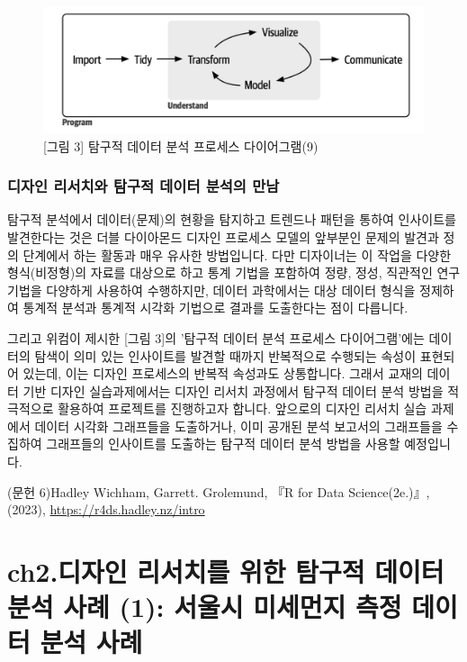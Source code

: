 \documentclass[
  letterpaper,
]{book}
\begin{document}
\begin{figure}[H]

{\centering \includegraphics{img/fig3.png}

}

\caption{{[}그림 3{]} 탐구적 데이터 분석 프로세스 다이어그램(9)}

\end{figure}%

\subsection{디자인 리서치와 탐구적 데이터 분석의
만남}\label{uxb514uxc790uxc778-uxb9acuxc11cuxce58uxc640-uxd0d0uxad6cuxc801-uxb370uxc774uxd130-uxbd84uxc11duxc758-uxb9ccuxb0a8}

탐구적 분석에서 데이터(문제)의 현황을 탐지하고 트렌드나 패턴을 통하여
인사이트를 발견한다는 것은 더블 다이아몬드 디자인 프로세스 모델의
앞부분인 문제의 발견과 정의 단계에서 하는 활동과 매우 유사한 방법입니다.
다만 디자이너는 이 작업을 다양한 형식(비정형)의 자료를 대상으로 하고
통계 기법을 포함하여 정량, 정성, 직관적인 연구 기법을 다양하게 사용하여
수행하지만, 데이터 과학에서는 대상 데이터 형식을 정제하여 통계적 분석과
통계적 시각화 기법으로 결과를 도출한다는 점이 다릅니다.

그리고 위컴이 제시한 {[}그림 3{]}의 '탐구적 데이터 분석 프로세스
다이어그램'에는 데이터의 탐색이 의미 있는 인사이트를 발견할 때까지
반복적으로 수행되는 속성이 표현되어 있는데, 이는 디자인 프로세스의
반복적 속성과도 상통합니다. 그래서 교재의 데이터 기반 디자인
실습과제에서는 디자인 리서치 과정에서 탐구적 데이터 분석 방법을
적극적으로 활용하여 프로젝트를 진행하고자 합니다. 앞으로의 디자인 리서치
실습 과제에서 데이터 시각화 그래프들을 도출하거나, 이미 공개된 분석
보고서의 그래프들을 수집하여 그래프들의 인사이트를 도출하는 탐구적
데이터 분석 방법을 사용할 예정입니다.

(문헌 6)Hadley Wichham, Garrett. Grolemund, 『R for Data Science(2e.)』,
(2023), \url{https://r4ds.hadley.nz/intro}

\chapter{ch2.디자인 리서치를 위한 탐구적 데이터 분석 사례 (1): 서울시
미세먼지 측정 데이터 분석
사례}\label{ch2.uxb514uxc790uxc778-uxb9acuxc11cuxce58uxb97c-uxc704uxd55c-uxd0d0uxad6cuxc801-uxb370uxc774uxd130-uxbd84uxc11d-uxc0acuxb840-1-uxc11cuxc6b8uxc2dc-uxbbf8uxc138uxba3cuxc9c0-uxce21uxc815-uxb370uxc774uxd130-uxbd84uxc11d-uxc0acuxb840}
\end{document}
